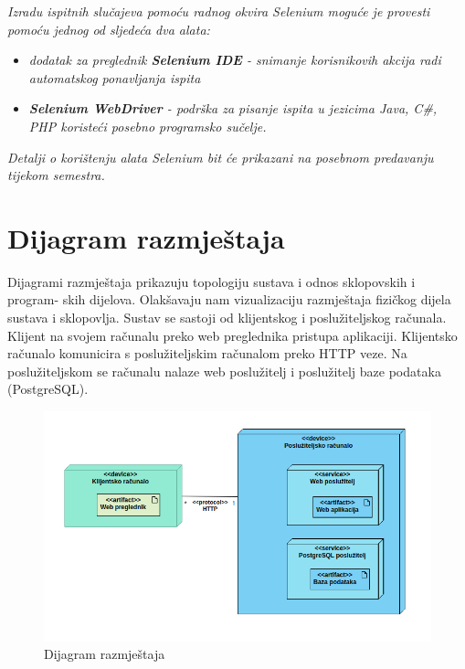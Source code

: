 			 \textit{Izradu ispitnih slučajeva pomoću radnog okvira Selenium moguće je provesti pomoću jednog od sljedeća dva alata:}
			 \begin{itemize}
			 	\item \textit{dodatak za preglednik \textbf{Selenium IDE} - snimanje korisnikovih akcija radi automatskog ponavljanja ispita	}
			 	\item \textit{\textbf{Selenium WebDriver} - podrška za pisanje ispita u jezicima Java, C\#, PHP koristeći posebno programsko sučelje.}
			 \end{itemize}
		 	\textit{Detalji o korištenju alata Selenium bit će prikazani na posebnom predavanju tijekom semestra.}
			
			\eject 
		
		
		\section{Dijagram razmještaja}
			
			Dijagrami razmještaja prikazuju topologiju sustava i odnos sklopovskih i program-
skih dijelova. Olakšavaju nam vizualizaciju razmještaja fizičkog dijela sustava i
sklopovlja. Sustav se sastoji od klijentskog i poslužiteljskog računala. Klijent na
svojem računalu preko web preglednika pristupa aplikaciji. Klijentsko računalo
komunicira s poslužiteljskim računalom preko HTTP veze. Na poslužiteljskom se
računalu nalaze web poslužitelj i poslužitelj baze podataka (PostgreSQL).

\begin{figure}[H]
	\centering
	\includegraphics[width=\textwidth, scale=0.5]{dijagrami/dijagram_razmjestaja}
	\caption{Dijagram razmještaja}
	\label{fig:dijagram_razmještaja}
\end{figure}
			
